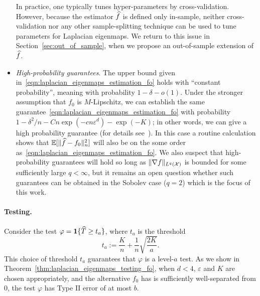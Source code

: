 \begin{itemize}
	In practice, one typically tunes hyper-parameters by cross-validation. However, because the estimator $\widehat{f}$ is defined only in-sample, neither cross-validation nor any other sample-splitting technique can be used to tune parameters for Laplacian eigenmaps. We return to this issue in Section~\ref{sec:out_of_sample}, when we propose an out-of-sample extension of $\widehat{f}$. 
	
	\item \emph{High-probability guarantees}. The upper bound given in~\eqref{eqn:laplacian_eigenmaps_estimation_fo} holds with ``constant probability'', meaning with probability $1 - \delta - o(1)$. Under the stronger assumption that $f_0$ is $M$-Lipschitz, we can establish the same guarantee~\eqref{eqn:laplacian_eigenmaps_estimation_fo} with probability $1 - \delta^2/n - Cn\exp(-cn\varepsilon^d) - \exp(-K)$; in other words, we can give a high probability guarantee (for details see~\cite{green2021}). In this case a routine calculation shows that $\mathbb{E}[\|\widehat{f} - f_0\|_n^2]$ will also be on the some order as~\eqref{eqn:laplacian_eigenmaps_estimation_fo}. We also suspect that high-probability guarantees will hold so long as $\|\nabla f\|_{L^q(\mathcal{X})}$ is bounded for some sufficiently large $q < \infty$, but it remains an open question whether such guarantees can be obtained in the Sobolev case ($q = 2$) which is the focus of this work. 
\end{itemize}

\paragraph{Testing.} Consider the test $\varphi = \mathbf{1}\{\widehat{T} \geq t_{a}\}$, where $t_{a}$ is the threshold
\begin{equation*}
t_{a} := \frac{K}{n} + \frac{1}{n}\sqrt{\frac{2K}{a}}.
\end{equation*}
This choice of threshold $t_{a}$ guarantees that $\varphi$ is a level-$a$ test. As we show in Theorem~\ref{thm:laplacian_eigenmaps_testing_fo}, when $d < 4$, $\varepsilon$ and $K$ are chosen appropriately, and the alternative $f_0$ has is sufficiently well-separated from $0$, the test $\varphi$ has Type II error of at most $b$.

